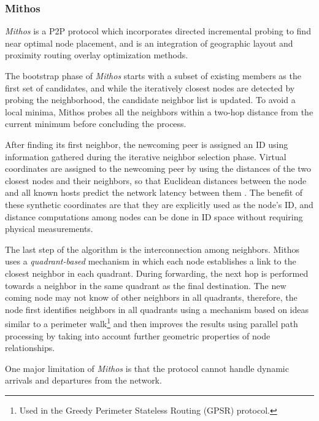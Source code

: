 \subsubsection{Mithos}
\emph{Mithos} \cite{WR2003} is a P2P protocol which incorporates directed
incremental probing to find near optimal node placement, and is an integration
of geographic layout and proximity routing overlay optimization methods.

The bootstrap phase of \emph{Mithos} starts with a subset of existing members as
the first set of candidates, and while the iteratively closest nodes are detected by
probing the neighborhood, the candidate neighbor list is updated. To
avoid a local minima, Mithos probes all the neighbors within a two-hop distance
from the current minimum before concluding the process.

After finding its first neighbor, the newcoming peer is assigned an ID using
information gathered during the iterative neighbor selection phase. Virtual
coordinates are assigned to the newcoming peer by using the distances of the two
closest nodes and their neighbors, so that Euclidean distances between the node
and all known hosts predict the network latency between them
\cite{cox_vivaldi_2004}. The benefit of these synthetic coordinates are that
they are explicitly used as the node's ID, and distance computations among nodes
can be done in ID space without requiring physical measurements.

The last step of the algorithm is the interconnection among neighbors. Mithos
uses a \emph{quadrant-based} mechanism in which each node establishes
a link to the closest neighbor in each quadrant. During forwarding, the next
hop is performed towards a neighbor in the same quadrant as the final
destination. The new coming node may not know of other neighbors in all
quadrants, therefore, the node first identifies neighbors in all quadrants
using a mechanism based on ideas similar to a perimeter walk\footnote{Used in
the Greedy Perimeter Stateless Routing (GPSR) protocol.} and then improves the
results using parallel path processing by taking into account further geometric
properties of node relationships.

One major limitation of \textit{Mithos} is that the protocol cannot handle
dynamic arrivals and departures from the network.


%
%

